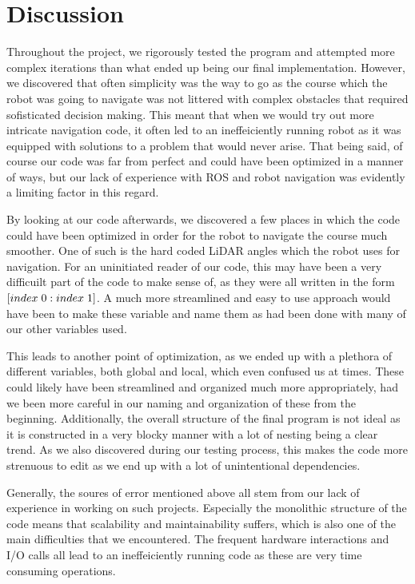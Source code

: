 \documentclass[conference]{IEEEtran}
\begin{document}
\section{Discussion}
Throughout the project, we rigorously tested the program and attempted more complex iterations than what ended up being our final implementation.
However, we discovered that often simplicity was the way to go as the course which the robot was going to navigate was not littered with complex obstacles that required sofisticated decision making.
This meant that when we would try out more intricate navigation code, it often led to an ineffeiciently running robot as it was equipped with solutions to a problem that would never arise.
That being said, of course our code was far from perfect and could have been optimized in a manner of ways, but our lack of experience with ROS and robot navigation was evidently a limiting factor in this regard.

By looking at our code afterwards, we discovered a few places in which the code could have been optimized in order for the robot to navigate the course much smoother.
One of such is the hard coded LiDAR angles which the robot uses for navigation. For an uninitiated reader of our code, this may have been a very difficuilt part of the code to make sense of, as they were all written in the form $[index \hspace{1mm} 0: index \hspace{1mm} 1]$.
A much more streamlined and easy to use approach would have been to make these variable and name them as had been done with many of our other variables used.

This leads to another point of optimization, as we ended up with a plethora of different variables, both global and local, which even confused us at times. These could likely have been streamlined and organized much more appropriately, had we been more careful in our naming and organization of these from the beginning.
Additionally, the overall structure of the final program is not ideal as it is constructed in a very blocky manner with a lot of nesting being a clear trend. As we also discovered during our testing process, this makes the code more strenuous to edit as we end up with a lot of unintentional dependencies.

Generally, the soures of error mentioned above all stem from our lack of experience in working on such projects. Especially the monolithic structure of the code means that scalability and maintainability suffers, which is also one of the main difficulties that we encountered.
The frequent hardware interactions and I/O calls all lead to an ineffeiciently running code as these are very time consuming operations.
\end{document}
